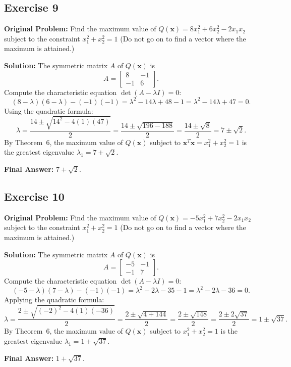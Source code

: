 \documentclass[11pt, letterpaper]{article}
\theoremstyle{definition}
\theoremstyle{remark}
\begin{document}
\subsection{Exercise 9}
\textbf{Original Problem:} Find the maximum value of $Q(\mathbf{x}) = 8x_1^2 + 6x_2^2 - 2x_1x_2$ subject to the constraint $x_1^2 + x_2^2 = 1$ (Do not go on to find a vector where the maximum is attained.)

\textbf{Solution:}
The symmetric matrix $A$ of $Q(\mathbf{x})$ is
\[
A = \begin{bmatrix} 8 & -1 \\ -1 & 6 \end{bmatrix}.
\]
Compute the characteristic equation $\det(A - \lambda I) = 0$:
\[
(8 - \lambda)(6 - \lambda) - (-1)(-1) = \lambda^2 - 14\lambda + 48 - 1 = \lambda^2 - 14\lambda + 47 = 0.
\]
Using the quadratic formula:
\[
\lambda = \frac{14 \pm \sqrt{14^2 - 4(1)(47)}}{2} = \frac{14 \pm \sqrt{196 - 188}}{2} = \frac{14 \pm \sqrt{8}}{2} = 7 \pm \sqrt{2}.
\]
By Theorem~6, the maximum value of $Q(\mathbf{x})$ subject to $\mathbf{x}^T \mathbf{x} = x_1^2 + x_2^2 = 1$ is the greatest eigenvalue $\lambda_1 = 7 + \sqrt{2}$.

\textbf{Final Answer:} $7 + \sqrt{2}$.

\subsection{Exercise 10}
\textbf{Original Problem:} Find the maximum value of $Q(\mathbf{x}) = -5x_1^2 + 7x_2^2 - 2x_1x_2$ subject to the constraint $x_1^2 + x_2^2 = 1$ (Do not go on to find a vector where the maximum is attained.)

\textbf{Solution:}
The symmetric matrix $A$ of $Q(\mathbf{x})$ is
\[
A = \begin{bmatrix} -5 & -1 \\ -1 & 7 \end{bmatrix}.
\]
Compute the characteristic equation $\det(A - \lambda I) = 0$:
\[
(-5 - \lambda)(7 - \lambda) - (-1)(-1) = \lambda^2 - 2\lambda - 35 - 1 = \lambda^2 - 2\lambda - 36 = 0.
\]
Applying the quadratic formula:
\[
\lambda = \frac{2 \pm \sqrt{(-2)^2 - 4(1)(-36)}}{2} = \frac{2 \pm \sqrt{4 + 144}}{2} = \frac{2 \pm \sqrt{148}}{2} = \frac{2 \pm 2\sqrt{37}}{2} = 1 \pm \sqrt{37}.
\]
By Theorem~6, the maximum value of $Q(\mathbf{x})$ subject to $x_1^2 + x_2^2 = 1$ is the greatest eigenvalue $\lambda_1 = 1 + \sqrt{37}$.

\textbf{Final Answer:} $1 + \sqrt{37}$.
\end{document}

